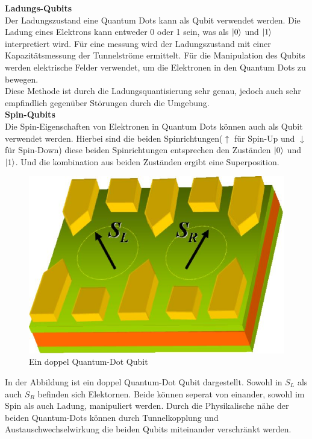 \textbf{Ladungs-Qubits}\\
Der Ladungszustand eine Quantum Dots kann als Qubit verwendet werden. Die Ladung eines Elektrons kann entweder 0 oder 1 sein, was als $\ket{0}$ und $\ket{1}$ interpretiert wird.
Für eine messung wird der Ladungszustand mit einer Kapazitätsmessung der Tunnelströme ermittelt.
Für die Manipulation des Qubits werden elektrische Felder verwendet, um die Elektronen in den Quantum Dots zu bewegen.\\

Diese Methode ist durch die Ladungsquantisierung sehr genau, jedoch auch sehr empfindlich gegenüber Störungen durch die Umgebung.\\

\textbf{Spin-Qubits}\\
Die Spin-Eigenschaften von Elektronen in Quantum Dots können auch als Qubit verwendet werden. Hierbei sind die beiden Spinrichtungen($\uparrow$ für Spin-Up und $\downarrow$ für Spin-Down)
diese beiden Spinrichtungen entsprechen den Zuständen $\ket{0}$ und $\ket{1}$. Und die kombination aus beiden Zuständen ergibt eine Superposition.\\

\begin{figure}[H]
    \centering
    \includegraphics[width=0.75\linewidth]{img/QD.png}
    \caption{Ein doppel Quantum-Dot Qubit}
    \label{fig:double-Quantum-Dot}
\end{figure}

In der Abbildung ist ein doppel Quantum-Dot Qubit dargestellt. Sowohl in $S_L$ als auch $S_R$ befinden sich Elektornen. Beide können seperat von einander, sowohl im Spin als auch Ladung, manipuliert werden.
Durch die Physikalische nähe der beiden Quantum-Dots können durch Tunnelkopplung und Austauschwechselwirkung die beiden Qubits miteinander verschränkt werden.\\

